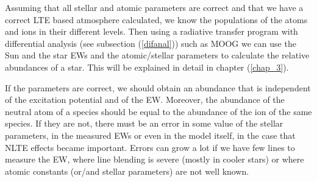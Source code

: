 \documentclass[dvips,12pt,a4paper]{report}
\begin{document}
{%

Assuming that all stellar and atomic parameters are correct and that we have a correct LTE based atmosphere calculated, we know the populations of the atoms and ions in their different levels. Then using a radiative transfer program with differential analysis (see subsection (\ref{difanal})) such as MOOG \citep{Sneden-1973} we can use the Sun and the star EWs and the atomic/stellar parameters to calculate the relative abundances of a star. This will be explained in detail in chapter (\ref{chap_3}).

If the parameters are correct, we should obtain an abundance that is independent of the excitation potential and of the EW. Moreover, the abundance of the neutral atom of a species should be equal to the abundance of the ion of the same species. If they are not, there must be an error in some value of the stellar parameters, in the measured EWs or even in the model itself, in the case that NLTE effects became important. Errors can grow a lot if we have few lines to measure the EW, where line blending is severe (mostly in cooler stars) or where atomic constants (or/and stellar parameters) are not well known.







}
\end{document}
